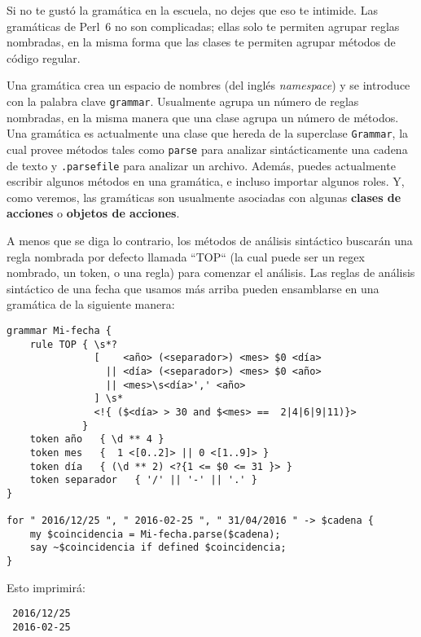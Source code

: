 Si no te gustó la gramática en la escuela, no dejes que eso te 
intimide. Las gramáticas de Perl~6 no son complicadas; ellas solo
te permiten agrupar reglas nombradas, en la misma forma que las clases
te permiten agrupar métodos de código regular.

Una gramática crea un espacio de nombres (del inglés \emph{namespace})
y se introduce con la palabra clave {\tt grammar}. Usualmente
agrupa un número de reglas nombradas, en la misma manera que
una clase agrupa un número de métodos. Una gramática es 
actualmente una clase que hereda de la superclase {\tt Grammar},
la cual provee métodos tales como {\tt parse} para analizar
sintácticamente una cadena de texto y {\tt .parsefile} para
analizar un archivo. Además, puedes actualmente escribir 
algunos métodos en una gramática, e incluso importar algunos
roles. Y, como veremos, las gramáticas son usualmente 
asociadas con algunas {\bf clases de acciones} o 
{\bf objetos de acciones}.

A menos que se diga lo contrario, los métodos de análisis
sintáctico buscarán una regla nombrada por defecto llamada 
``TOP`` (la cual puede ser un regex nombrado, un token, o una 
regla) para comenzar el análisis. Las reglas de análisis 
sintáctico de una fecha que usamos más arriba pueden
ensamblarse en una gramática de la siguiente manera:

\label{dategrammar}
\begin{lstlisting}
grammar Mi-fecha {
    rule TOP { \s*? 
               [    <año> (<separador>) <mes> $0 <día>
                 || <día> (<separador>) <mes> $0 <año> 
                 || <mes>\s<día>',' <año>                     
               ] \s* 
               <!{ ($<día> > 30 and $<mes> ==  2|4|6|9|11)}>  
             }
    token año   { \d ** 4 }                                        
    token mes   {  1 <[0..2]> || 0 <[1..9]> }                
    token día   { (\d ** 2) <?{1 <= $0 <= 31 }> }  
    token separador   { '/' || '-' || '.' } 
}                         

for " 2016/12/25 ", " 2016-02-25 ", " 31/04/2016 " -> $cadena {
	my $coincidencia = Mi-fecha.parse($cadena);
	say ~$coincidencia if defined $coincidencia;
}
\end{lstlisting}

Esto imprimirá:
\begin{lstlisting}
 2016/12/25
 2016-02-25
\end{lstlisting}

